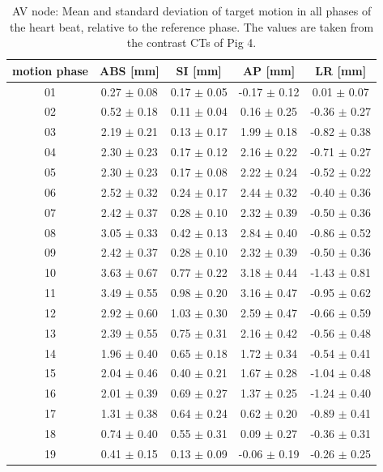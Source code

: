 \documentclass[type=dr, dr=rernat, accentcolor=tud7b,colorbacktitle, bigchapter, openright, twoside, 12pt ]{tudthesis}
\begin{document}
\begin{table}[htbp]
  \centering
    \tiny
  \caption{AV node: Mean and standard deviation of target motion in all phases of the heart beat, relative to the reference phase. The values are 
  taken from the contrast CTs of Pig 4.}
  \begin{tabular}{|c|c|c|c|c|}
    \hline\hline
    motion phase\rule{0pt}{2.6ex}\rule[-1.2ex]{0pt}{0pt} & ABS [mm] & SI [mm] & AP [mm] & LR [mm]\\
    \hline
01 &0.27 $\pm$ 0.08 &0.17 $\pm$ 0.05 &-0.17 $\pm$ 0.12 &0.01 $\pm$ 0.07 \\
02 &0.52 $\pm$ 0.18 &0.11 $\pm$ 0.04 &0.16 $\pm$ 0.25 &-0.36 $\pm$ 0.27 \\
03 &2.19 $\pm$ 0.21 &0.13 $\pm$ 0.17 &1.99 $\pm$ 0.18 &-0.82 $\pm$ 0.38 \\
04 &2.30 $\pm$ 0.23 &0.17 $\pm$ 0.12 &2.16 $\pm$ 0.22 &-0.71 $\pm$ 0.27 \\
05 &2.30 $\pm$ 0.23 &0.17 $\pm$ 0.08 &2.22 $\pm$ 0.24 &-0.52 $\pm$ 0.22 \\
06 &2.52 $\pm$ 0.32 &0.24 $\pm$ 0.17 &2.44 $\pm$ 0.32 &-0.40 $\pm$ 0.36 \\
07 &2.42 $\pm$ 0.37 &0.28 $\pm$ 0.10 &2.32 $\pm$ 0.39 &-0.50 $\pm$ 0.36 \\
08 &3.05 $\pm$ 0.33 &0.42 $\pm$ 0.13 &2.84 $\pm$ 0.40 &-0.86 $\pm$ 0.52 \\
09 &2.42 $\pm$ 0.37 &0.28 $\pm$ 0.10 &2.32 $\pm$ 0.39 &-0.50 $\pm$ 0.36 \\
10 &3.63 $\pm$ 0.67 &0.77 $\pm$ 0.22 &3.18 $\pm$ 0.44 &-1.43 $\pm$ 0.81 \\
11 &3.49 $\pm$ 0.55 &0.98 $\pm$ 0.20 &3.16 $\pm$ 0.47 &-0.95 $\pm$ 0.62 \\
12 &2.92 $\pm$ 0.60 &1.03 $\pm$ 0.30 &2.59 $\pm$ 0.47 &-0.66 $\pm$ 0.59 \\
13 &2.39 $\pm$ 0.55 &0.75 $\pm$ 0.31 &2.16 $\pm$ 0.42 &-0.56 $\pm$ 0.48 \\
14 &1.96 $\pm$ 0.40 &0.65 $\pm$ 0.18 &1.72 $\pm$ 0.34 &-0.54 $\pm$ 0.41 \\
15 &2.04 $\pm$ 0.46 &0.40 $\pm$ 0.21 &1.67 $\pm$ 0.28 &-1.04 $\pm$ 0.48 \\
16 &2.01 $\pm$ 0.39 &0.69 $\pm$ 0.27 &1.37 $\pm$ 0.25 &-1.24 $\pm$ 0.40 \\
17 &1.31 $\pm$ 0.38 &0.64 $\pm$ 0.24 &0.62 $\pm$ 0.20 &-0.89 $\pm$ 0.41 \\
18 &0.74 $\pm$ 0.40 &0.55 $\pm$ 0.31 &0.09 $\pm$ 0.27 &-0.36 $\pm$ 0.31 \\
19 &0.41 $\pm$ 0.15 &0.13 $\pm$ 0.09 &-0.06 $\pm$ 0.19 &-0.26 $\pm$ 0.25 \\
    \hline\hline
  \end{tabular}
  \label{tab:motion:AV:Pig4}
\end{table}
\end{document}
